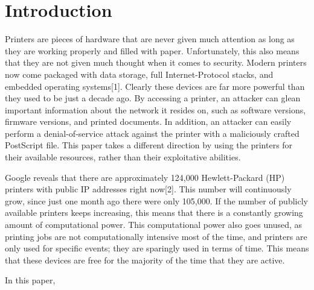 \section{Introduction}

Printers are pieces of hardware that are never given much attention as long as they are working properly and filled with paper.
Unfortunately, this also means that they are not given much thought when it comes to security.
Modern printers now come packaged with data storage, full Internet-Protocol stacks, and embedded operating systems[1].
Clearly these devices are far more powerful than they used to be just a decade ago.
By accessing a printer, an attacker can glean important information about the network it resides on, such as software versions, firmware versions, and printed documents.
In addition, an attacker can easily perform a denial-of-service attack against the printer with a maliciously crafted PostScript file.
This paper takes a different direction by using the printers for their available resources, rather than their exploitative abilities.

Google reveals that there are approximately 124,000 Hewlett-Packard (HP) printers with public IP addresses right now[2].
This number will continuously grow, since just one month ago there were only 105,000.
If the number of publicly available printers keeps increasing, this means that there is a constantly growing amount of computational power.
This computational power also goes unused, as printing jobs are not computationally intensive most of the time, and printers are only used for specific events; they are sparingly used in terms of time.
This means that these devices are free for the majority of the time that they are active.

In this paper, 

